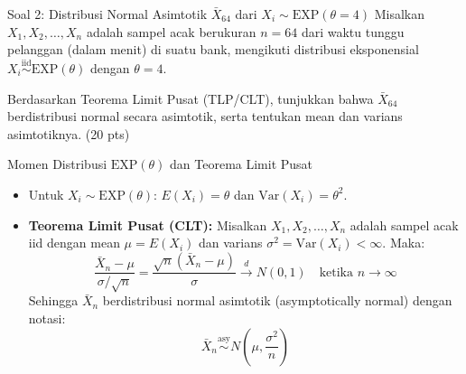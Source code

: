 \documentclass[10pt,twoside]{article}
\begin{document}
\begin{soalbox}{Soal 2: Distribusi Normal Asimtotik $\bar{X}_{64}$ dari $X_i \sim \mathrm{EXP}(\theta = 4)$}
Misalkan $X_1, X_2, \dots, X_n$ adalah sampel acak berukuran $n = 64$ dari waktu tunggu pelanggan (dalam menit) di suatu bank, mengikuti distribusi eksponensial $X_i \overset{\mathrm{iid}}{\sim} \mathrm{EXP}(\theta)$ dengan $\theta = 4$.

Berdasarkan Teorema Limit Pusat (TLP/CLT), tunjukkan bahwa $\bar{X}_{64}$ berdistribusi normal secara asimtotik, serta tentukan mean dan varians asimtotiknya. (20 pts)
\end{soalbox}

\begin{tipbox}{Momen Distribusi $\mathrm{EXP}(\theta)$ dan Teorema Limit Pusat}
\begin{itemize}
  \item Untuk $X_i \sim \mathrm{EXP}(\theta)$: $E(X_i) = \theta$ dan $\mathrm{Var}(X_i) = \theta^2$.
  \item \textbf{Teorema Limit Pusat (CLT):} Misalkan $X_1, X_2, \dots, X_n$ adalah sampel acak iid dengan mean $\mu = E(X_i)$ dan varians $\sigma^2 = \mathrm{Var}(X_i) < \infty$. Maka:
  \[
  \frac{\bar{X}_n - \mu}{\sigma / \sqrt{n}} = \frac{\sqrt{n}(\bar{X}_n - \mu)}{\sigma} \xrightarrow{d} N(0, 1) \quad \text{ketika } n \to \infty
  \]
  Sehingga $\bar{X}_n$ berdistribusi normal asimtotik (asymptotically normal) dengan notasi:
  \[
  \bar{X}_n \stackrel{\mathrm{asy}}{\sim} N\!\left(\mu, \frac{\sigma^2}{n}\right)
  \]
\end{itemize}
\end{tipbox}
\end{document}
